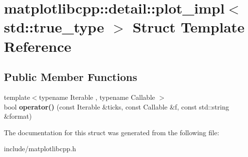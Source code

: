 \hypertarget{structmatplotlibcpp_1_1detail_1_1plot__impl_3_01std_1_1true__type_01_4}{}\section{matplotlibcpp\+:\+:detail\+:\+:plot\+\_\+impl$<$ std\+:\+:true\+\_\+type $>$ Struct Template Reference}
\label{structmatplotlibcpp_1_1detail_1_1plot__impl_3_01std_1_1true__type_01_4}
\subsection*{Public Member Functions}
\begin{DoxyCompactItemize}
\item 
{\footnotesize template$<$typename Iterable , typename Callable $>$ }\\bool {\bfseries operator()} (const Iterable \&ticks, const Callable \&f, const std\+::string \&format)\hypertarget{structmatplotlibcpp_1_1detail_1_1plot__impl_3_01std_1_1true__type_01_4_ad182cd7d9a599f3a12d3ac7316b68ecb}{}\label{structmatplotlibcpp_1_1detail_1_1plot__impl_3_01std_1_1true__type_01_4_ad182cd7d9a599f3a12d3ac7316b68ecb}

\end{DoxyCompactItemize}


The documentation for this struct was generated from the following file\+:\begin{DoxyCompactItemize}
\item 
include/matplotlibcpp.\+h\end{DoxyCompactItemize}

